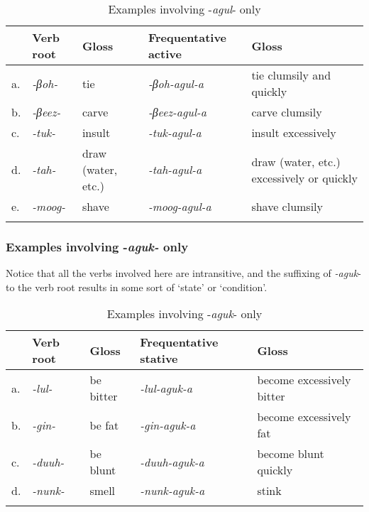 \documentclass[output=paper		  ]{langscibook}
\begin{document}
\begin{table}
\begin{tabularx}{\textwidth}{ll>{\raggedright\arraybackslash}p{}>{\raggedright\arraybackslash}p{}Q}
\lsptoprule
 &{{{{Verb} {root}}}} & {{{{Gloss}}}} & {{{{Frequentative} {{active}}}}} & {Gloss}\\
 \midrule
 {a.}&{\textit{-βoh-}} & { {tie}} & {\itshape {}-βoh-agul-a} & tie clumsily and quickly\\
 {b.} &{\textit{{}-βeez-}} & carve & {\itshape {}-βeez-agul-a} & carve clumsily\\
 {c.}&{\textit{-tuk-}} & insult & {\itshape {}-tuk-agul-a} & { {insult excessively}}\\
 {d.}&{\textit{-tah-}} & draw (water, etc.) & {\itshape {}-tah-agul-a} & draw (water, etc.) excessively or quickly\\
 {e.} &{\textit{{}-moog-}} & shave & {\itshape {}-moog-agul-a} & shave clumsily\\
\lspbottomrule
\end{tabularx}
\caption{Examples involving -\textit{agul}- only}
\label{tabex:kahigi:27}
\end{table}





\subsubsection{Examples involving -\textit{aguk-} only}
\label{sec:kahigi:2.10.3}

{Notice that all the verbs involved here are intransitive, and the suffixing of} {\textit{{}-aguk}}{{}- to the verb root results in some sort of ‘state’ or ‘condition’.}

\begin{table}
\begin{tabularx}{\textwidth}{lll>{\raggedright\arraybackslash}p{}Q}

\lsptoprule
 & { {{{Verb} {root}}}} & {Gloss} & {{{{Frequentative} {{stative}}}}} & {{{{Gloss}}}}\\
 \midrule
{a.}& {\textit{{}-lul-}} & {{be bitter}} & {\itshape {}-lul-aguk-a} & become excessively bitter\\
 {b.}& {\textit{{}-gin-}} & be fat & {\itshape {}-gin-aguk-a} & become excessively fat\\
 {c.}& {\textit{{}-duuh-}} & be blunt & {\itshape {}-duuh-aguk-a} & become blunt quickly\\
 {d.}& {\textit{{}-nunk-}} & {{smell}} & {\itshape {}-nunk-aguk-a} & stink\\
\lspbottomrule
\end{tabularx}
\caption{Examples involving -\textit{aguk}- only}
\label{tabex:kahigi:28}
\end{table}
\end{document}
